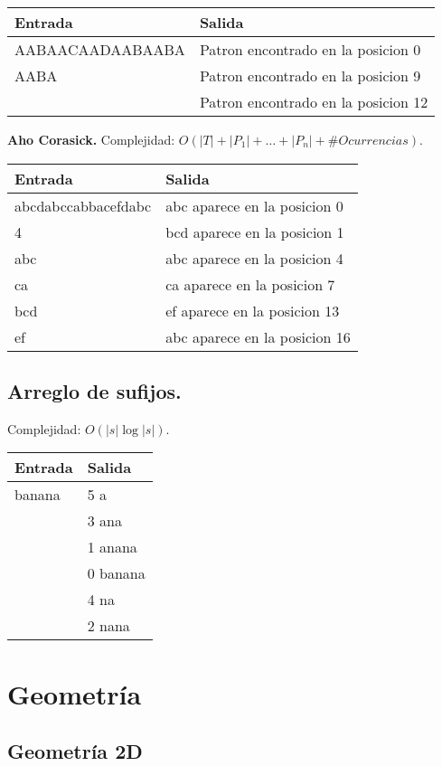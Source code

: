\documentclass[10pt, letterpaper, twoside]{article}
\begin{document}
\begin{tabular}{|p{7cm}|p{7cm}|}
\hline
\textbf{Entrada} & \textbf{Salida}\\ \hline
AABAACAADAABAABA & Patron encontrado en la posicion 0\\
AABA             & Patron encontrado en la posicion 9\\
                 & Patron encontrado en la posicion 12\\ \hline
\end{tabular}\bigskip

\textbf{Aho Corasick.} Complejidad: $O(|T| + |P_1| + \ldots + |P_n| + \#Ocurrencias)$.



\begin{tabular}{|p{7cm}|p{7cm}|}
\hline
\textbf{Entrada} & \textbf{Salida}\\ \hline
abcdabccabbacefdabc & abc aparece en la posicion 0\\
4                   & bcd aparece en la posicion 1\\
abc                 & abc aparece en la posicion 4\\
ca                  & ca aparece en la posicion 7\\
bcd                 & ef aparece en la posicion 13\\
ef                  & abc aparece en la posicion 16\\ \hline
\end{tabular}

\subsection{Arreglo de sufijos.}

Complejidad: $O(|s|\log |s|)$.



\begin{tabular}{|p{7cm}|p{7cm}|}
\hline
\textbf{Entrada} & \textbf{Salida}\\ \hline
banana & 5 a\\
& 3 ana\\
& 1 anana\\
& 0 banana\\
& 4 na\\
& 2 nana\\ \hline
\end{tabular}


\section{Geometría}

\subsection{Geometría 2D}


\end{document}
